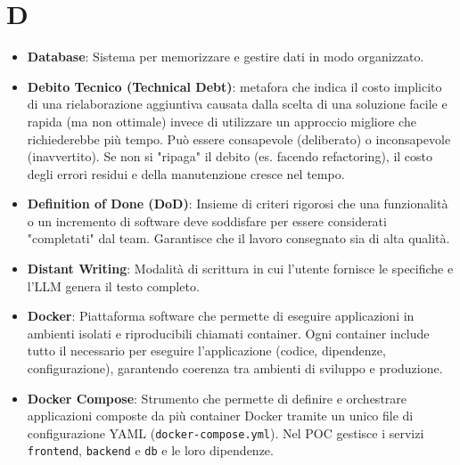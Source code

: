 \documentclass[11pt,a4paper]{article}
\begin{document}
\section*{D}
\begin{itemize}
\item \textbf{Database}: Sistema per memorizzare e gestire dati in modo organizzato.

\item \textbf{Debito Tecnico (Technical Debt)}: metafora che indica il costo implicito di una rielaborazione aggiuntiva causata dalla scelta di una soluzione facile e rapida (ma non ottimale) invece di utilizzare un approccio migliore che richiederebbe più tempo. Può essere consapevole (deliberato) o inconsapevole (inavvertito).
Se non si "ripaga" il debito (es. facendo refactoring), il costo degli errori residui e della manutenzione cresce nel tempo.

\item \textbf{Definition of Done (DoD)}: Insieme di criteri rigorosi che una funzionalità o un incremento di software deve soddisfare per essere considerati "completati" dal team. Garantisce che il lavoro consegnato sia di alta qualità.

\item \textbf{Distant Writing}: Modalità di scrittura in cui l'utente fornisce le specifiche e l'LLM genera il testo completo.

\item \textbf{Docker}: Piattaforma software che permette di eseguire 
applicazioni in ambienti isolati e riproducibili chiamati container. 
Ogni container include tutto il necessario per eseguire l'applicazione 
(codice, dipendenze, configurazione), garantendo coerenza tra ambienti 
di sviluppo e produzione.

\item \textbf{Docker Compose}: Strumento che permette di definire e 
orchestrare applicazioni composte da più container Docker tramite un unico file di configurazione YAML (\texttt{docker-compose.yml}). Nel POC gestisce i servizi \texttt{frontend}, \texttt{backend} e \texttt{db} e le loro dipendenze.
\end{itemize}

\newpage
\end{document}
